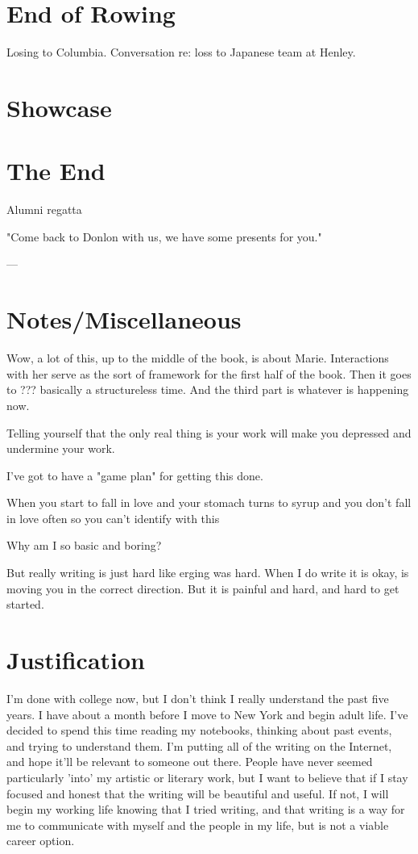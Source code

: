\documentclass[12pt]{article}
\begin{document}
\section{End of Rowing}
Losing to Columbia.
Conversation re: loss to Japanese team at Henley.

\section{Showcase}


\section{The End}
Alumni regatta

"Come back to Donlon with us, we have some presents for you."

---

\section{Notes/Miscellaneous}
Wow, a lot of this, up to the middle of the book, is about Marie.  Interactions
with her serve as the sort of framework for the first half of the book.  Then it
goes to ???  basically a structureless time.  And the third part is whatever is
happening now.

Telling yourself that the only real thing is your work will make you depressed
and undermine your work.  

I've got to have a "game plan" for getting this done.

When you start to fall in love
and your stomach turns to syrup
and you don't fall in love often
so you can't identify with this

Why am I so basic and boring?

But really writing is just hard like erging was hard.  When I do write it is
okay, is moving you in the correct direction.  But it is painful and hard, and
hard to get started.

\section{Justification}
I'm done with college now, but I don't think I really understand the past five
years.  I have about a month before I move to New York and begin adult life.
I've decided to spend this time reading my notebooks, thinking about past
events, and trying to understand them.  I'm putting all of the writing on the
Internet, and hope it'll be relevant to someone out there.  People have never
seemed particularly 'into' my artistic or literary work, but I want to believe
that if I stay focused and honest that the writing will be beautiful and
useful.  If not, I will begin my working life knowing that I tried writing, and
that writing is a way for me to communicate with myself and the people in my
life, but is not a viable career option.
\end{document}
